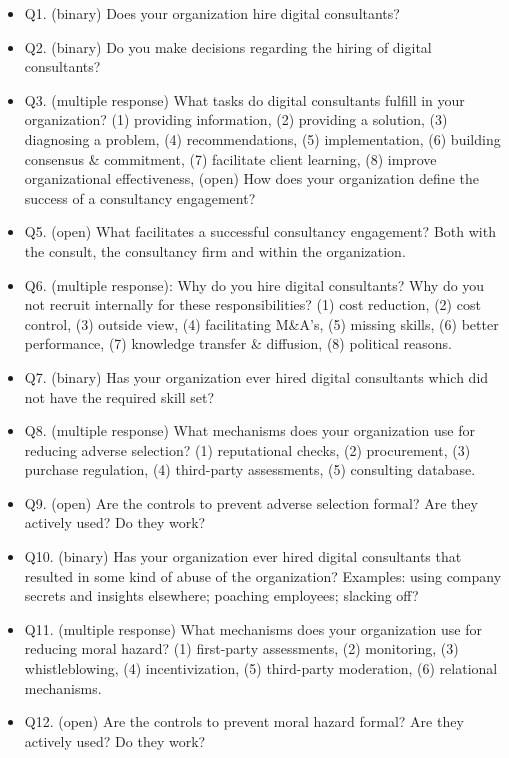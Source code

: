 \documentclass[12pt]{article}
\begin{document}
\begin{itemize}
\item
  Q1. (binary) Does your organization hire digital consultants?
\item
  Q2. (binary) Do you make decisions regarding the hiring of digital
  consultants?
\item
  Q3. (multiple response) What tasks do digital consultants fulfill in
  your organization? (1) providing information, (2) providing a
  solution, (3) diagnosing a problem, (4) recommendations, (5)
  implementation, (6) building consensus \& commitment, (7) facilitate
  client learning, (8) improve organizational effectiveness, (open) How
  does your organization define the success of a consultancy engagement?
\item
  Q5. (open) What facilitates a successful consultancy engagement? Both
  with the consult, the consultancy firm and within the organization.
\item
  Q6. (multiple response): Why do you hire digital consultants? Why do
  you not recruit internally for these responsibilities? (1) cost
  reduction, (2) cost control, (3) outside view, (4) facilitating
  M\&A's, (5) missing skills, (6) better performance, (7) knowledge
  transfer \& diffusion, (8) political reasons.
\item
  Q7. (binary) Has your organization ever hired digital consultants
  which did not have the required skill set?
\item
  Q8. (multiple response) What mechanisms does your organization use for
  reducing adverse selection? (1) reputational checks, (2) procurement,
  (3) purchase regulation, (4) third-party assessments, (5) consulting
  database.
\item
  Q9. (open) Are the controls to prevent adverse selection formal? Are
  they actively used? Do they work?
\item
  Q10. (binary) Has your organization ever hired digital consultants
  that resulted in some kind of abuse of the organization? Examples:
  using company secrets and insights elsewhere; poaching employees;
  slacking off?
\item
  Q11. (multiple response) What mechanisms does your organization use
  for reducing moral hazard? (1) first-party assessments, (2)
  monitoring, (3) whistleblowing, (4) incentivization, (5) third-party
  moderation, (6) relational mechanisms.
\item
  Q12. (open) Are the controls to prevent moral hazard formal? Are they
  actively used? Do they work?
\end{itemize}
\end{document}
